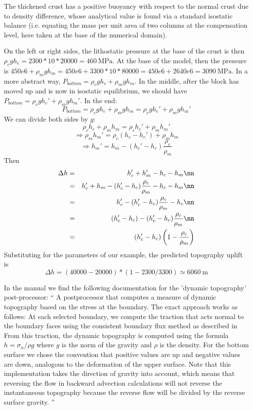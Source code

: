 The thickened crust has a positive buoyancy with respect to the normal crust due
to density difference, whose analytical value is found via a standard isostatic balance (i.e.
equating the mass per unit area of two columns at the compensation level, here taken at
the base of the numerical domain).




On the left or right sides, the lithostatic pressure at the base of the crust is then 
$\rho_{c} g h_{c}=2300*10*20000=460~\si{\mega\pascal}$.
At the base of the model, then the pressure is $450e6+\rho_{m} g h_{m}
=450e6+3300*10*80000=450e6+2640e6=3090~\si{\mega\pascal}$.
In a more abstract way, $P_{bottom}=\rho_c g h_c + \rho_m g h_m$.
In the middle, after the block has moved up and is now in isostatic equilibrium, 
we should have $P_{bottom}=\rho_c g h_c' + \rho_m g h_m'$.
In the end:
\[
P_{bottom}=\rho_c g h_c + \rho_m g h_m = \rho_c g h_c' + \rho_m g h_m'
\]
We can divide both sides by $g$:
\[
\rho_c  h_c + \rho_m  h_m = \rho_c  h_c' + \rho_m  h_m'
\]
\[
\Rightarrow \rho_m h_m'= \rho_c(h_c-h_c') + \rho_m h_m 
\]
\[
\Rightarrow h_m'=h_m-(h_c'-h_c)\frac{\rho_c}{\rho_m} 
\]
Then
\begin{eqnarray}
\Delta h 
&=& h_c' + h_m' - h_c - h_m \nn\\
&=& h_c' + h_m -(h_c'-h_c)\frac{\rho_c}{\rho_m} -h_c - h_m \nn\\
&=& h_c'  -(h_c'-h_c)\frac{\rho_c}{\rho_m} -h_c  \nn\\
&=& (h_c'-h_c)  -(h_c'-h_c)\frac{\rho_c}{\rho_m}   \nn\\
&=& (h_c'-h_c) \left(1 -\frac{\rho_c}{\rho_m} \right) 
\end{eqnarray}
Substituting for the parameters of our example, the predicted topography uplift is 
\[
\Delta h = (40000-20000)*(1-2300/3300) \simeq 6060~\si{\meter}
\]


In the \aspect manual we find the following documentation for the 'dynamic topography' post-processor:
``
A postprocessor that computes a measure of dynamic topography based on the stress at the boundary. 
The exact approach works as follows: At each selected boundary, we compute the traction that acts normal to 
the boundary faces using the consistent boundary flux method as described in \textcite{grls87}
From this traction, the dynamic topography is computed using the formula $h=\sigma_n / \rho g$ where $g$
is the norm of the gravity and $\rho$
is the density. For the bottom surface we chose the convention that positive values are up and negative values are down, 
analogous to the deformation of the upper surface. Note that this implementation takes the direction of 
gravity into account, which means that reversing the flow in backward advection calculations will not reverse 
the instantaneous topography because the reverse flow will be divided by the reverse surface gravity. 
''


